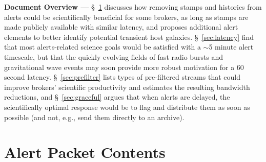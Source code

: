 \documentclass[DM,lsstdraft,authoryear,toc]{lsstdoc}
\begin{document}
{\bf Document Overview ---} \S~\ref{sec:packets} discusses how removing stamps and histories from alerts could be scientifically beneficial for some brokers, as long as stamps are made publicly available with similar latency, and proposes additional alert elements to better identify potential transient host galaxies.
\S~\ref{sec:latency} find that most alerts-related science goals would be satisfied with a $\sim$5 minute alert timescale, but that the quickly evolving fields of fast radio bursts and gravitational wave events may soon provide more robust motivation for a 60 second latency.
\S~\ref{sec:prefilter} lists types of pre-filtered streams that could improve brokers' scientific productivity and estimates the resulting bandwidth reductions, and \S~\ref{sec:graceful} argues that when alerts are delayed, the scientifically optimal response would be to flag and distribute them as soon as possible (and not, e.g., send them directly to an archive).


\clearpage
\section{Alert Packet Contents} \label{sec:packets}
\end{document}
